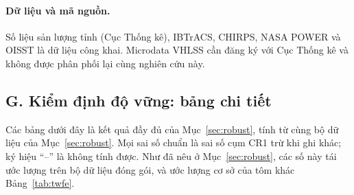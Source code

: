 \documentclass[12pt,a4paper]{article}
\begin{document}
\paragraph{Dữ liệu và mã nguồn.} Số liệu sản lượng tỉnh (Cục Thống kê), IBTrACS, CHIRPS, NASA POWER và OISST là dữ liệu công khai. Microdata VHLSS cần đăng ký với Cục Thống kê và không được phân phối lại cùng nghiên cứu này.

\subsection*{G. Kiểm định độ vững: bảng chi tiết}

Các bảng dưới đây là kết quả đầy đủ của Mục~\ref{sec:robust}, tính từ cùng bộ dữ liệu của Mục~\ref{sec:robust}. Mọi sai số chuẩn là sai số cụm CR1 trừ khi ghi khác; ký hiệu ``--'' là không tính được. Như đã nêu ở Mục~\ref{sec:robust}, các số này tái ước lượng trên bộ dữ liệu đóng gói, và ước lượng cơ sở của tôm khác Bảng~\ref{tab:twfe}.
\end{document}
